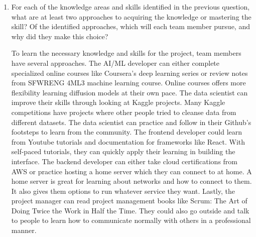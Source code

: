 \documentclass[12pt]{article}
\begin{document}
\begin{enumerate}
  \item For each of the knowledge areas and skills identified in the previous
  question, what are at least two approaches to acquiring the knowledge or
  mastering the skill?  Of the identified approaches, which will each team
  member pursue, and why did they make this choice?

  To learn the necessary knowledge and skills for the project, team members have several 
  approaches. The AI/ML developer can either complete specialized online courses like Coursera’s 
  deep learning series or review notes from SFWRENG 4ML3 machine learning course. Online courses 
  offers more flexibility learning diffusion models at their own pace. The data scientist can 
  improve their skills through looking at Kaggle projects. Many Kaggle competitions have projects 
  where other people tried to cleanse data from different datasets. The data scientist can 
  practice and follow in their Github’s footsteps to learn from the community. The frontend 
  developer could learn from Youtube tutorials and documentation for frameworks like React. With 
  self-paced tutorials, they can quickly apply their learning in building the interface. The 
  backend developer can either take cloud certifications from AWS or practice hosting a home 
  server which they can connect to at home. A home server is great for learning about networks and 
  how to connect to them. It also gives them options to run whatever service they want. Lastly, 
  the project manager can read project management books like Scrum: The Art of Doing Twice the 
  Work in Half the Time. They could also go outside and talk to people to learn how to communicate 
  normally with others in a professional manner.

\end{enumerate}
\end{document}
